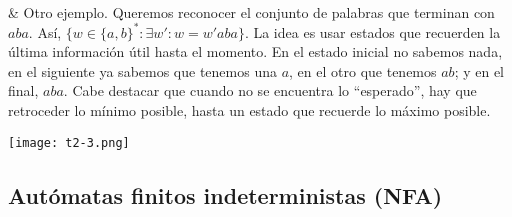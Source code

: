 \begin{easylist}[itemize]
\ 

& Otro ejemplo. Queremos reconocer el conjunto de palabras que terminan con $aba$. Así, $\{w \in \{a, b\}^* \colon \exists w' \colon w = w'aba\}$. La idea es usar estados que recuerden la última información útil hasta el momento. En el estado inicial no sabemos nada, en el siguiente ya sabemos que tenemos una $a$, en el otro que tenemos $ab$; y en el final, $aba$. Cabe destacar que cuando no se encuentra lo ``esperado'', hay que retroceder lo mínimo posible, hasta un estado que recuerde lo máximo posible.

\texttt{[image: t2-3.png]}

\end{easylist}

\subsection{Autómatas finitos indeterministas (NFA)}
